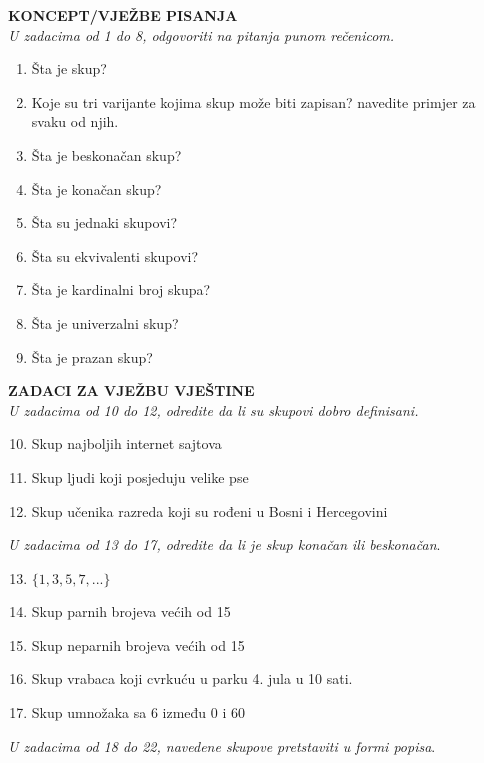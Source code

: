 \documentclass[a4paper,14pt,svgnames]{article}
\newcounter{counter}
\begin{document}
\vspace{2cm}
\begin{tcolorbox}[title=\textbf{ZADACI ZA VJEŽBU}]
\begin{minipage}{0.5\textwidth}
\textbf{KONCEPT/VJEŽBE PISANJA}\\
\textit{U zadacima od 1 do 8, odgovoriti na pitanja punom rečenicom.}
\begin{enumerate}
\item Šta je skup?
\item Koje su tri varijante kojima skup može biti zapisan? navedite primjer za svaku od njih.
\item Šta je beskonačan skup?
\item Šta je konačan skup?
\item Šta su jednaki skupovi?
\item Šta su ekvivalenti skupovi?
\item Šta je kardinalni broj skupa?
\item Šta je univerzalni skup?
\item Šta je prazan skup?
\end{enumerate}
\textbf{ZADACI ZA VJEŽBU VJEŠTINE}\\
\textit{U zadacima od 10 do 12, odredite da li su skupovi dobro definisani.}
\begin{enumerate}
\setcounter{enumi}{9}
\item Skup najboljih internet sajtova
\item Skup ljudi koji posjeduju velike pse
\item Skup učenika razreda koji su rođeni u Bosni i Hercegovini
\end{enumerate}
\end{minipage}
\begin{minipage}{0.5\textwidth}
\textit{U zadacima od 13 do 17, odredite da li je skup konačan ili beskonačan}.
\begin{enumerate}
\setcounter{enumi}{12}
\item $\{1, 3, 5, 7, ...\}$
\item Skup parnih brojeva većih od 15
\item Skup neparnih brojeva većih od 15
\item Skup vrabaca koji cvrkuću u parku 4. jula u 10 sati.
\item Skup umnožaka sa 6 između 0 i 60
\end{enumerate}
\textit{U zadacima od 18 do 22, navedene skupove pretstaviti u formi popisa}.
\begin{enumerate}

\end{enumerate}
\end{minipage}
\end{tcolorbox}
\end{document}
